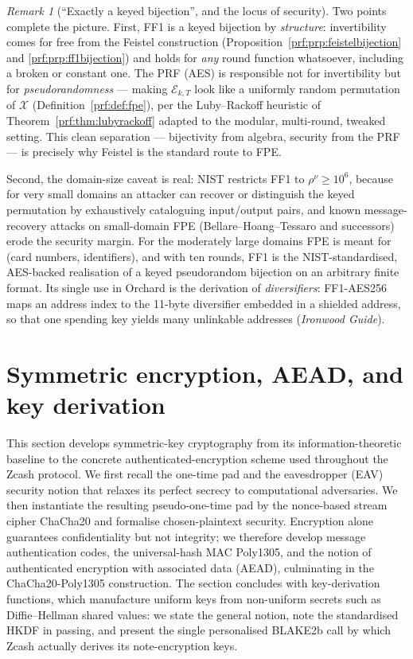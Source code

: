 \documentclass[11pt,a4paper]{article}
\theoremstyle{definition}
\theoremstyle{remark}
\newtheorem{remark}[theorem]{Remark}
\begin{document}
\begin{remark}[``Exactly a keyed bijection'', and the locus of security]\label{prf:rem:fpe}
Two points complete the picture. First, FF1 is a keyed bijection by \emph{structure}: invertibility comes for free from the Feistel construction (Proposition~\ref{prf:prp:feistelbijection} and \ref{prf:prp:ff1bijection}) and holds for \emph{any} round function whatsoever, including a broken or constant one. The PRF (AES) is responsible not for invertibility but for \emph{pseudorandomness} --- making \(\mathcal{E}_{k,T}\) look like a uniformly random permutation of \(\mathcal{X}\) (Definition~\ref{prf:def:fpe}), per the Luby--Rackoff heuristic of Theorem~\ref{prf:thm:lubyrackoff} adapted to the modular, multi-round, tweaked setting. This clean separation --- bijectivity from algebra, security from the PRF --- is precisely why Feistel is the standard route to FPE.

Second, the domain-size caveat is real: NIST restricts FF1 to \(\rho^{\nu} \ge 10^{6}\), because for very small domains an attacker can recover or distinguish the keyed permutation by exhaustively cataloguing input/output pairs, and known message-recovery attacks on small-domain FPE (Bellare--Hoang--Tessaro and successors) erode the security margin. For the moderately large domains FPE is meant for (card numbers, identifiers), and with ten rounds, FF1 is the NIST-standardised, AES-backed realisation of a keyed pseudorandom bijection on an arbitrary finite format. Its single use in Orchard is the derivation of \emph{diversifiers}: FF1-AES256 maps an address index to the 11-byte diversifier embedded in a shielded address, so that one spending key yields many unlinkable addresses (\emph{Ironwood Guide}).
\end{remark}

\clearpage
\section{Symmetric encryption, AEAD, and key derivation}\label{sec:symmetric}

This section develops symmetric-key cryptography from its information-theoretic baseline to the concrete authenticated-encryption scheme used throughout the Zcash protocol. We first recall the one-time pad and the eavesdropper (EAV) security notion that relaxes its perfect secrecy to computational adversaries. We then instantiate the resulting pseudo-one-time pad by the nonce-based stream cipher \textsf{ChaCha20} and formalise chosen-plaintext security. Encryption alone guarantees confidentiality but not integrity; we therefore develop message authentication codes, the universal-hash MAC \textsf{Poly1305}, and the notion of authenticated encryption with associated data (AEAD), culminating in the \textsf{ChaCha20-Poly1305} construction. The section concludes with key-derivation functions, which manufacture uniform keys from non-uniform secrets such as Diffie--Hellman shared values: we state the general notion, note the standardised \textsf{HKDF} in passing, and present the single personalised BLAKE2b call by which Zcash actually derives its note-encryption keys.
\end{document}
